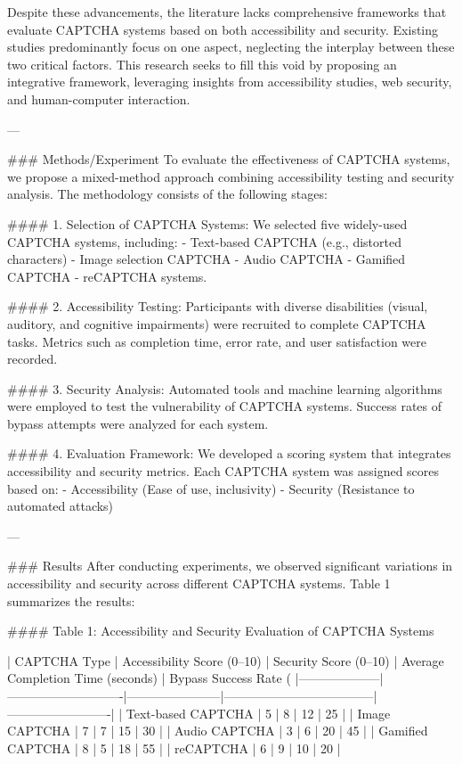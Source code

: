 Despite these advancements, the literature lacks comprehensive frameworks that evaluate CAPTCHA systems based on both accessibility and security. Existing studies predominantly focus on one aspect, neglecting the interplay between these two critical factors. This research seeks to fill this void by proposing an integrative framework, leveraging insights from accessibility studies, web security, and human-computer interaction.

---

### Methods/Experiment
To evaluate the effectiveness of CAPTCHA systems, we propose a mixed-method approach combining accessibility testing and security analysis. The methodology consists of the following stages:

#### 1. Selection of CAPTCHA Systems:
We selected five widely-used CAPTCHA systems, including:
- Text-based CAPTCHA (e.g., distorted characters)
- Image selection CAPTCHA
- Audio CAPTCHA
- Gamified CAPTCHA
- reCAPTCHA systems.

#### 2. Accessibility Testing:
Participants with diverse disabilities (visual, auditory, and cognitive impairments) were recruited to complete CAPTCHA tasks. Metrics such as completion time, error rate, and user satisfaction were recorded.

#### 3. Security Analysis:
Automated tools and machine learning algorithms were employed to test the vulnerability of CAPTCHA systems. Success rates of bypass attempts were analyzed for each system.

#### 4. Evaluation Framework:
We developed a scoring system that integrates accessibility and security metrics. Each CAPTCHA system was assigned scores based on:
- Accessibility (Ease of use, inclusivity)
- Security (Resistance to automated attacks)

---

### Results
After conducting experiments, we observed significant variations in accessibility and security across different CAPTCHA systems. Table 1 summarizes the results:

#### Table 1: Accessibility and Security Evaluation of CAPTCHA Systems

| CAPTCHA Type       | Accessibility Score (0–10) | Security Score (0–10) | Average Completion Time (seconds) | Bypass Success Rate (%
|--------------------|----------------------------|-----------------------|------------------------------------|-------------------------|
| Text-based CAPTCHA | 5                          | 8                     | 12                                 | 25                      |
| Image CAPTCHA      | 7                          | 7                     | 15                                 | 30                      |
| Audio CAPTCHA      | 3                          | 6                     | 20                                 | 45                      |
| Gamified CAPTCHA   | 8                          | 5                     | 18                                 | 55                      |
| reCAPTCHA          | 6                          | 9                     | 10                                 | 20                      |

